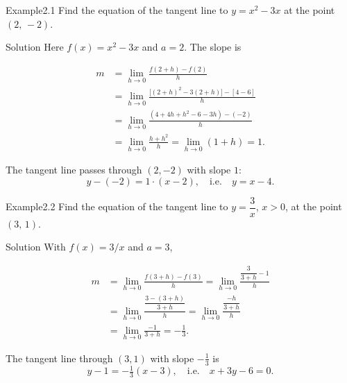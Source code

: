 \documentclass[a4paper,12pt,oneside]{memoir}
\begin{document}
\begin{workedexample}
\begin{envexample}{Example}{2.1}{}
Find the equation of the tangent line to \(y = x^{2} - 3x\) at the point \((2,\, -2)\).
\end{envexample}
\begin{envsolution}{Solution}{}{}
Here \(f(x) = x^{2} - 3x\) and \(a = 2\). The slope is

\[ \begin{aligned}
          m &= \lim_{h \to 0} \frac{f(2 + h) - f(2)}{h} \\
            &= \lim_{h \to 0} \frac{\bigl[(2+h)^{2} - 3(2+h)\bigr] - [4 - 6]}{h} \\
            &= \lim_{h \to 0} \frac{(4 + 4h + h^{2} - 6 - 3h) - (-2)}{h} \\
            &= \lim_{h \to 0} \frac{h + h^{2}}{h}
             = \lim_{h \to 0} (1 + h) = 1.
        \end{aligned} \]

The tangent line passes through \((2, -2)\) with slope \(1\): \[ y - (-2) = 1 \cdot (x - 2), \quad \text{i.e.} \quad y = x - 4. \]
\end{envsolution}
\end{workedexample}
\begin{workedexample}
\begin{envexample}{Example}{2.2}{}
Find the equation of the tangent line to \(y = \dfrac{3}{x}\), \(x > 0\), at the point \((3,\, 1)\).
\end{envexample}
\begin{envsolution}{Solution}{}{}
With \(f(x) = 3/x\) and \(a = 3\),

\[ \begin{aligned}
          m &= \lim_{h \to 0} \frac{f(3 + h) - f(3)}{h}
             = \lim_{h \to 0} \frac{\dfrac{3}{3 + h} - 1}{h} \\[6pt]
            &= \lim_{h \to 0} \frac{\dfrac{3 - (3 + h)}{3 + h}}{h}
             = \lim_{h \to 0} \frac{\dfrac{-h}{3 + h}}{h} \\[6pt]
            &= \lim_{h \to 0} \frac{-1}{3 + h} = -\frac{1}{3}.
        \end{aligned} \]

The tangent line through \((3, 1)\) with slope \(-\tfrac{1}{3}\) is \[ y - 1 = -\tfrac{1}{3}(x - 3), \quad \text{i.e.} \quad x + 3y - 6 = 0. \]
\end{envsolution}
\end{workedexample}
\end{document}
